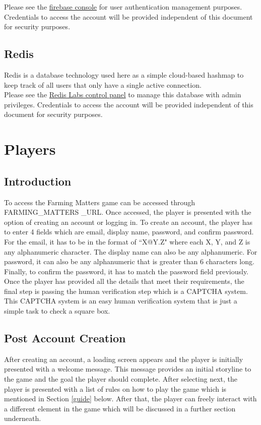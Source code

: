 \documentclass{article}
\begin{document}
Please see the \href{https://console.firebase.google.com/u/0/}{firebase console} for user authentication management purposes.
Credentials to access the account will be provided independent of this document for security purposes.

\subsection{Redis}
Redis is a database technology used here as a simple cloud-based hashmap to keep track of all users that only have a single active connection. \\

Please see the \href{https://app.redislabs.com/?_gl=1*1y5yqpk*_ga*MTMyOTYyODQ1OS4xNjgwNzUzMjYx*_ga_8BKGRQKRPV*MTY4MDc1MzI2MC4xLjAuMTY4MDc1MzI2MC42MC4wLjA.#/}{Redis Labs control panel} to manage this database with admin privileges. 
Credentials to access the account will be provided independent of this document for security purposes.
\newpage

\section{Players}
\subsection{Introduction}
To access the Farming Matters game can be accessed through FARMING\_MATTERS \_URL. Once accessed, the player is presented with the option of creating an account or logging in. To create an account, the player has to enter 4 fields which are email, display name, password, and confirm password. For the email, it has to be in the format of ``X@Y.Z" where each X, Y, and Z is any alphanumeric character. The display name can also be any alphanumeric. For password, it can also be any alphanumeric that is greater than 6 characters long. Finally, to confirm the password, it has to match the password field previously. Once the player has provided all the details that meet their requirements, the final step is passing the human verification step which is a CAPTCHA system. This CAPTCHA system is an easy human verification system that is just a simple task to check a square box.

\subsection{Post Account Creation}
After creating an account, a loading screen appears and the player is initially presented with a welcome message. This message provides an initial storyline to the game and the goal the player should complete. After selecting next, the player is presented with a list of rules on how to play the game which is mentioned in Section \ref{guide} below. After that, the player can freely interact with a different element in the game which will be discussed in a further section underneath.
\end{document}
